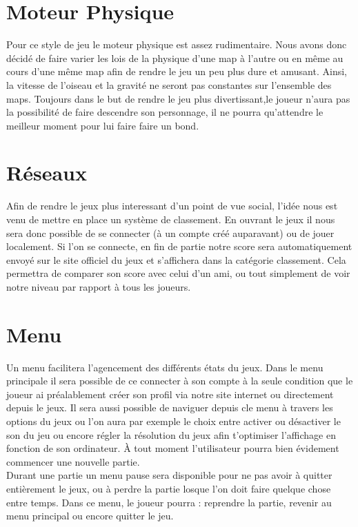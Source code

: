 \documentclass [11pt]{report}
\begin{document}
	\section {Moteur Physique}
	Pour ce style de jeu le moteur physique est assez rudimentaire. Nous avons donc décidé de faire varier les lois de la physique d'une map à l'autre ou en même au cours d'une même map afin de rendre le jeu un peu plus dure et amusant. Ainsi, la vitesse de l'oiseau et la gravité ne seront pas constantes sur l'ensemble des maps. Toujours dans le but de rendre le jeu plus divertissant,le joueur n'aura pas la possibilité de faire descendre son personnage, il ne pourra qu'attendre le meilleur moment pour lui faire faire un bond.\\\vspace{5mm}



	\section {Réseaux}
	Afin de rendre le jeux plus interessant d'un point de vue social, l'idée nous est venu de mettre en place un système de classement. En ouvrant le jeux il nous sera donc possible de se connecter (à un compte créé auparavant) ou de jouer localement. Si l'on se connecte, en fin de partie notre score sera automatiquement envoyé sur le site officiel du jeux et s'affichera dans la catégorie classement. Cela permettra de comparer son score avec celui d'un ami, ou tout simplement de voir notre niveau par rapport à tous les joueurs.\\\vspace{5mm}


	\section {Menu}
	Un menu facilitera l'agencement des différents états du jeux. Dans le menu principale il sera possible de ce connecter à son compte à la seule condition que le joueur ai préalablement créer son profil via notre site internet ou directement depuis le jeux. Il sera aussi possible de naviguer depuis cle menu à travers les options du jeux ou l'on aura par exemple le choix entre activer ou désactiver le son du jeu ou encore régler la résolution du jeux afin t'optimiser l'affichage en fonction de son ordinateur. \`A tout moment l'utilisateur pourra bien évidement commencer une nouvelle partie. \\
\indent Durant une partie un menu pause sera disponible pour ne pas avoir à quitter entièrement le jeux, ou à perdre la partie losque l'on doit faire quelque chose entre temps. Dans ce menu, le joueur pourra : reprendre la partie, revenir au menu principal ou encore quitter le jeu.\\\vspace{5mm}
\end{document}
